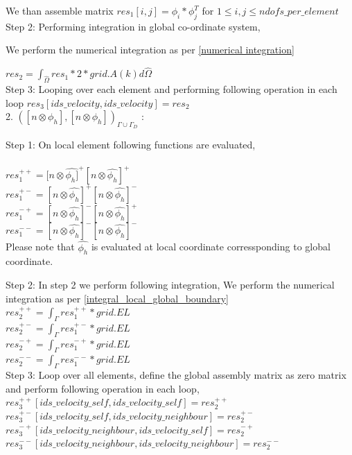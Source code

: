 \documentclass[a4paper,10pt]{book}
\begin{document}
We than assemble matrix $res_1[i,j]=\phi_i*\phi_j^T$ for $1 \leq i,j \leq ndofs\_per\_element$\\

Step 2: Performing integration in global co-ordinate system,

We perform the numerical integration as per \ref{numerical integration} 

$res_2 = \int_{\hat{\Omega}} res_1 *2*grid.A(k)  d \hat{\Omega}$\\

Step 3: Looping over each element and performing following operation in each loop $res_3[ids\_velocity,ids\_velocity]=res_2$\\


2. $([n \otimes \phi_h], [n \otimes \phi_h])_{\Gamma \cup \Gamma_D}$ :

Step 1: On local element following functions are evaluated,\\
\\
$res_1^{++} = [n \otimes \hat{\phi_h]}^+ [n \otimes \hat{\phi_h}]^+$\\
$res_1^{+-} = [n \otimes \hat{\phi_h}]^+ [n \otimes \hat{\phi_h}]^-$\\
$res_1^{-+} = [n \otimes \hat{\phi_h}]^- [n \otimes \hat{\phi_h}]^+$\\
$res_1^{--} = [n \otimes \hat{\phi_h}]^- [n \otimes \hat{\phi_h}]^-$\\

Please note that $\hat{\phi_h}$ is evaluated at local coordinate corressponding to global coordinate.

Step 2: In step 2 we perform following integration, 
We perform the numerical integration as per \ref{integral_local_global_boundary}
\\ 
$res_2^{++} = \int_{\Gamma} res_1^{++} * grid.EL$\\
$res_2^{+-} = \int_{\Gamma} res_1^{+-} * grid.EL$\\
$res_2^{-+} = \int_{\Gamma} res_1^{-+} * grid.EL$\\
$res_2^{--} = \int_{\Gamma} res_1^{--} * grid.EL$\\

Step 3: Loop over all elements, define the global assembly matrix as zero matrix and perform following operation in each loop,
\\
$res_3^{++}[ids\_velocity\_self,ids\_velocity\_self] = res_2^{++}$\\
$res_3^{+-}[ids\_velocity\_self,ids\_velocity\_neighbour] = res_2^{+-}$\\
$res_3^{-+}[ids\_velocity\_neighbour,ids\_velocity\_self] = res_2^{-+}$\\
$res_3^{--}[ids\_velocity\_neighbour,ids\_velocity\_neighbour] = res_2^{--}$\\
\end{document}
